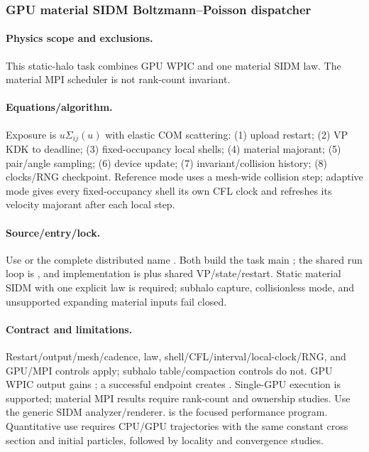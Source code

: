 \subsubsection{GPU material SIDM Boltzmann--Poisson dispatcher}
\paragraph{Physics scope and exclusions.}
This static-halo task combines GPU WPIC and one material SIDM law.  The
material MPI scheduler is not rank-count invariant.
\paragraph{Equations/algorithm.}
Exposure is \(u\Sigma_{ij}(u)\) with elastic COM scattering: (1) upload
restart; (2) VP KDK to deadline; (3) fixed-occupancy local shells; (4) material
majorant; (5) pair/angle sampling; (6) device update; (7) invariant/collision
history; (8) clocks/RNG checkpoint.  Reference mode uses a mesh-wide collision
step; adaptive mode gives every fixed-occupancy shell its own CFL clock and
refreshes its velocity majorant after each local step.
\paragraph{Source/entry/lock.}
Use  or the complete distributed name
.  Both build the task main
; the shared run loop is
, and implementation is
 plus shared VP/state/restart.  Static material SIDM
with one explicit law is required; subhalo capture, collisionless mode, and
unsupported expanding material inputs fail closed.
\paragraph{Contract and limitations.}
Restart/output/mesh/cadence, law, shell/CFL/interval/local-clock/RNG, and GPU/MPI controls
apply; subhalo table/compaction controls do not.  GPU WPIC output gains
; a successful endpoint creates
.  Single-GPU execution is supported;
material MPI results require rank-count and ownership studies.  Use the generic
SIDM analyzer/renderer.   is the focused
performance program.  Quantitative use requires CPU/GPU trajectories with the same constant
cross section and initial particles, followed by locality and convergence
studies.

